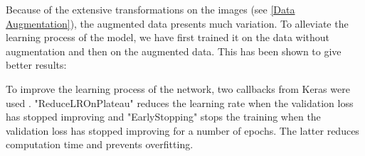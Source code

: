 Because of the extensive transformations on the images (see \cref{Data Augmentation}), the augmented data presents much variation.
To alleviate the learning process of the model, we have first trained it on the data without augmentation and then on the augmented data.
This has been shown to give better results: 

To improve the learning process of the network, two callbacks from Keras were used \cite{noauthor_callbacks_nodate}. "ReduceLROnPlateau" reduces the learning rate when the validation loss has stopped improving and "EarlyStopping" stops the training when the validation loss has stopped improving for a number of epochs.
The latter reduces computation time and prevents overfitting.